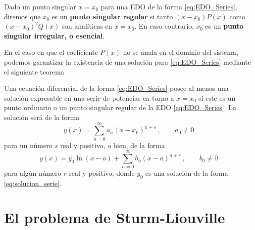 \begin{defi}
    Dado un punto singular $x=x_0$ para una EDO de la forma \eqref{eq:EDO_Series}, diremos que $x_0$ es un \textbf{punto singular regular} si tanto $(x-x_0)P(x)$ como $(x-x_0)^2Q(x)$ son analíticas en $x=x_0$. En caso contrario, $x_0$ es un \textbf{punto singular irregular, o esencial}.
\end{defi}

En el caso en que el coeficiente $P(x)$ no se anula en el dominio del sistema, podemos garantizar la existencia de una solución para \eqref{eq:EDO_Series} mediante el siguiente teorema
\begin{teorema}[de Fuchs]\label{teo:Fuchs}
    Una ecuación diferencial de la forma \eqref{eq:EDO_Series} posee al menos una solución expresable en una serie de potencias en torno a $x=x_0$ si este es un punto ordinario o un punto singular regular de la EDO \eqref{eq:EDO_Series}. La solución será de la forma 
    \begin{equation} \label{eq:solucion_serie}
        y(x) = \sum_{n=0}^\infty a_n(x-x_0)^{n+s} \ , \qquad a_0 \neq 0
    \end{equation}
    para un número $s$ real y positivo, o bien, de la forma 
    \begin{equation}
        y(x) = y_0 \ln(x-a) + \sum_{n=0}^\infty b_n (x-a)^{n+r} \ , \qquad b_0 \neq 0 
    \end{equation}
    para algún número $r$ real y positivo, donde $y_0$ es una solución de la forma \eqref{eq:solucion_serie}.
\end{teorema}



\section{El problema de Sturm-Liouville}

